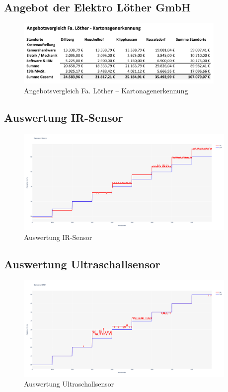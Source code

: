 \newpage
\subsection{Angebot der Elektro Löther GmbH}

\begin{figure}[htpb]
  \centering
  \includegraphics[width=0.9\textwidth]{./pics/AngebotLoether.png}
  \caption{Angebotsvergleich Fa. Löther -- Kartonagenerkennung}
  \label{appendix:fig:fa_loether_angebot}
\end{figure}


\subsection{Auswertung IR-Sensor}

\begin{figure}[htpb]
  \centering
  \includegraphics[width=0.95\textwidth]{./pics/plots/sharp_plot.png}
  \caption{Auswertung \ac{IR}-Sensor}
  \label{appendix:fig:irSensorAuswertung}
\end{figure}


\newpage
\subsection{Auswertung Ultraschallsensor}

\begin{figure}[htpb]
  \includegraphics[width=0.95\textwidth]{./pics/plots/sr04_plot.png}
  \caption{Auswertung Ultraschallsensor}
  \label{appendix:fig:ultraSensorAuswertung}
\end{figure}


